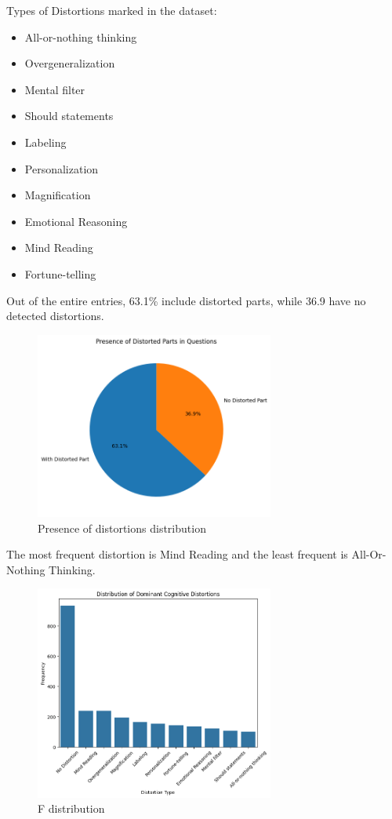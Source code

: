 \documentclass[runningheads,a4paper,11pt]{report}
\begin{document}
Types of Distortions marked in the dataset:

\begin{itemize}
\item All-or-nothing thinking
\item Overgeneralization
\item Mental filter
\item Should statements
\item Labeling
\item Personalization
\item Magnification
\item Emotional Reasoning
\item Mind Reading
\item Fortune-telling
\end{itemize}

Out of the entire entries, 63.1\% include distorted parts, while 36.9 have no detected distortions.

\begin{figure}[htbp!]
\centering
\includegraphics[width=0.7\textwidth]{pictures/presence_distrib.png}
\caption{Presence of distortions distribution}
\label{fig:presence_distrib}                                
\end{figure}

The most frequent distortion is Mind Reading and the least frequent is All-Or-Nothing Thinking.

\begin{figure}[htbp!]
\centering
\includegraphics[width=0.7\textwidth]{pictures/freq_distrib.png}
\caption{F distribution}
\label{fig:freq_distrib}                                
\end{figure}
\end{document}
